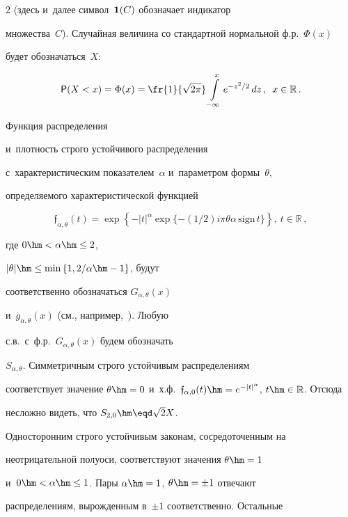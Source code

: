 \begin{multicols}{2}
(здесь и~далее символ~${\bf 1}(C)$ обозначает индикатор


множества~$C$). Случайная величина со стандартной нормальной ф.р.~$\Phi(x)$


будет обозначаться~$X$:


$$


{\sf P}(X<x)=\Phi(x)=\fr{1}{\sqrt{2\pi}}\int\limits_{-\infty}^{x}e^{-z^2/2}\,dz\,,


\enskip x\in\mathbb{R}\,.


$$


Функция распределения 


и~плот\-ность строго устойчивого распределения


с~характеристическим показателем~$\alpha$ и~параметром формы~$\theta$, 


определяемого характеристической функцией 


$$


\mathfrak{f}_{\alpha,\theta}(t)=


\exp\left\{-|t|^{\alpha}\exp\{-(1/2)i\pi\theta\alpha\,\mathrm{sign}\,t\}\right\},\


t\in\mathbb{R}\,,


$$


 где $0\hm<\alpha\hm\le2$,


$|\theta|\hm\le\min\left\{1,{2}/{\alpha}\hm-1\right\}$, будут


соответственно обозначаться $G_{\alpha,\theta}(x)$ 


и~$g_{\alpha,\theta}(x)$ (см., например,~\cite{Zolotarev1983}). Любую


с.в.\ с~ф.р.\ $G_{\alpha,\theta}(x)$ будем обозначать


$S_{\alpha,\theta}$. Симметричным строго устойчивым распределениям


соответствует значение $\theta\hm=0$ и~х.ф.~$\mathfrak{f}_{\alpha,0}(t)


\hm=e^{-|t|^{\alpha}}$, $t\hm\in\mathbb{R}$. Отсюда


несложно видеть, что $S_{2,0}\hm\eqd\sqrt{2}X$.





Односторонним строго устойчивым законам, сосредоточенным на


неотрицательной полуоси, соответствуют значения $\theta\hm=1$ 


и~$0\hm<\alpha\hm\le1$. Пары $\alpha\hm=1$, $\theta\hm=\pm1$ отвечают


распределениям, вы\-рож\-ден\-ным в~$\pm1$ соответственно. Остальные



\end{multicols}
